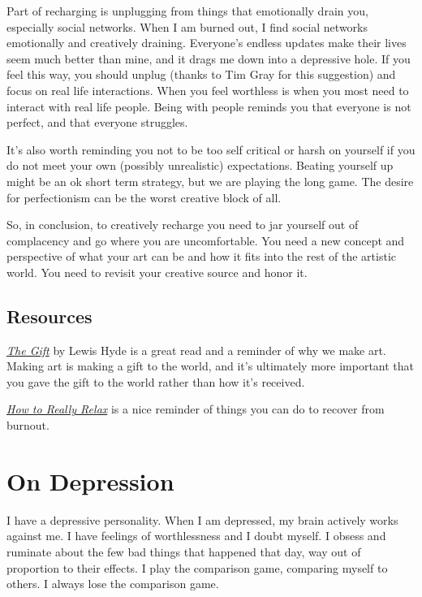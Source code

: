 \documentclass[
]{book}
\begin{document}
Part of recharging is unplugging from things that emotionally drain you, especially social networks. When I am burned out, I find social networks emotionally and creatively draining. Everyone's endless updates make their lives seem much better than mine, and it drags me down into a depressive hole. If you feel this way, you should unplug (thanks to Tim Gray for this suggestion) and focus on real life interactions. When you feel worthless is when you most need to interact with real life people. Being with people reminds you that everyone is not perfect, and that everyone struggles.

It's also worth reminding you not to be too self critical or harsh on yourself if you do not meet your own (possibly unrealistic) expectations. Beating yourself up might be an ok short term strategy, but we are playing the long game. The desire for perfectionism can be the worst creative block of all.

So, in conclusion, to creatively recharge you need to jar yourself out of complacency and go where you are uncomfortable. You need a new concept and perspective of what your art can be and how it fits into the rest of the artistic world. You need to revisit your creative source and honor it.

\hypertarget{resources-2}{%
\section{Resources}\label{resources-2}}

\href{http://www.lewishyde.com/publications/the-gift}{\emph{The Gift}} by Lewis Hyde is a great read and a reminder of why we make art. Making art is making a gift to the world, and it's ultimately more important that you gave the gift to the world rather than how it's received.

\href{http://lifehacker.com/how-you-can-learn-to-finally-really-relax-1548045887}{\emph{How to Really Relax}} is a nice reminder of things you can do to recover from burnout.

\hypertarget{on-depression}{%
\chapter{On Depression}\label{on-depression}}

I have a depressive personality. When I am depressed, my brain actively works against me. I have feelings of worthlessness and I doubt myself. I obsess and ruminate about the few bad things that happened that day, way out of proportion to their effects. I play the comparison game, comparing myself to others. I always lose the comparison game.
\end{document}

